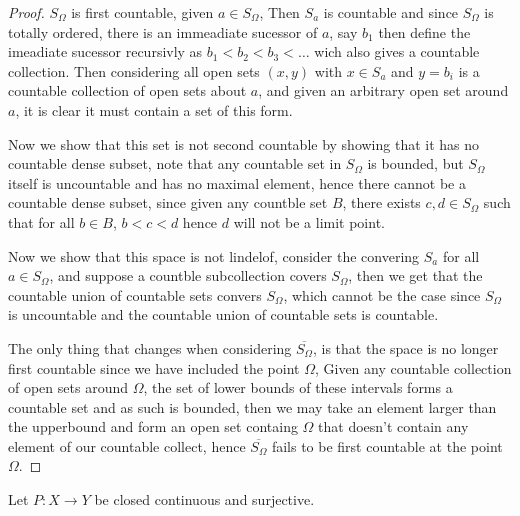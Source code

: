    \begin{proof}
        $S_\Omega$ is first countable, given $a \in S_\Omega$, Then $S_a$ is countable and since $S_\Omega$ is totally ordered, there is an immeadiate sucessor of $a$, say $b_1$ then define the imeadiate sucessor recursivly as $b_1<b_2<b_3<\dots$ wich also gives a countable collection. 
        Then considering all open sets $(x,y)$ with $x \in S_a$ and $y = b_i$ is a countable collection of open sets about $a$, and given an arbitrary open set around $a$, it is clear it must contain a set of this form. 

        Now we show that this set is not second countable by showing that it has no countable dense subset, note that any countable set in $S_\Omega$ is bounded, but $S_\Omega$ itself is uncountable and has no maximal element, hence there cannot be a countable dense subset, since given any countble set 
        $B$, there exists $c, d \in S_\Omega$ such that for all $b \in B$, $b < c < d$ hence $d$ will not be a limit point. 

        Now we show that this space is not lindelof, consider the convering $S_a$ for all $a \in S_\Omega$, and suppose a countble subcollection covers $S_\Omega$, then we get that the countable union of countable sets convers $S_\Omega$, which cannot be the case since $S_\Omega$ is uncountable and 
        the countable union of countable sets is countable. 

        The only thing that changes when considering $\overline{S_\Omega}$, is that the space is no longer first countable since we have included the point $\Omega$, Given any countable collection of open sets around $\Omega$, the set of lower bounds of these intervals forms a countable set and 
        as such is bounded, then we may take an element larger than the upperbound and form an open set containg $\Omega$ that doesn't contain any element of our countable collect, hence $\overline{S_\Omega}$ fails to be first countable at the point $\Omega$. 
    \end{proof} 




    \question
    Let $P:X \to Y$ be closed continuous and surjective. 

